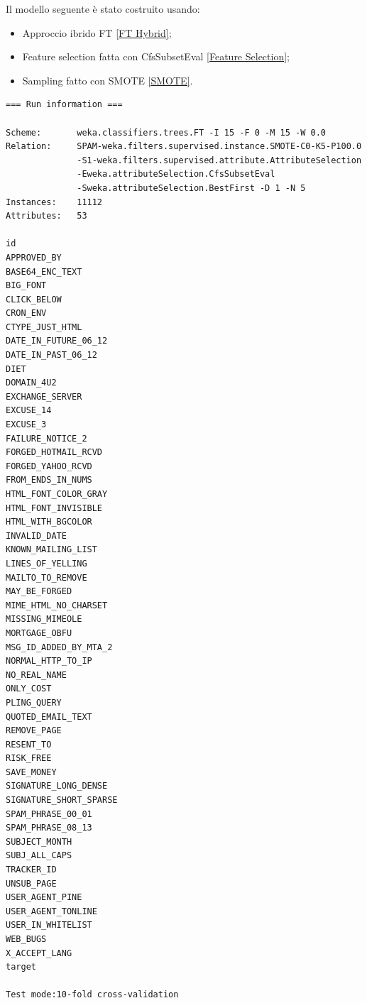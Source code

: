 Il modello seguente è stato costruito usando:
\begin{itemize}
	\item Approccio ibrido FT \ref{FT Hybrid};
	\item Feature selection fatta con CfsSubsetEval \ref{Feature Selection};
	\item Sampling fatto con SMOTE \ref{SMOTE}.
\end{itemize}

\lstset{style=customWeka}
\begin{lstlisting}
=== Run information ===

Scheme:		  weka.classifiers.trees.FT -I 15 -F 0 -M 15 -W 0.0
Relation:     SPAM-weka.filters.supervised.instance.SMOTE-C0-K5-P100.0
			  -S1-weka.filters.supervised.attribute.AttributeSelection
			  -Eweka.attributeSelection.CfsSubsetEval
			  -Sweka.attributeSelection.BestFirst -D 1 -N 5
Instances:    11112
Attributes:   53

id
APPROVED_BY
BASE64_ENC_TEXT
BIG_FONT
CLICK_BELOW
CRON_ENV
CTYPE_JUST_HTML
DATE_IN_FUTURE_06_12
DATE_IN_PAST_06_12			
DIET
DOMAIN_4U2					
EXCHANGE_SERVER
EXCUSE_14					
EXCUSE_3
FAILURE_NOTICE_2			
FORGED_HOTMAIL_RCVD
FORGED_YAHOO_RCVD			
FROM_ENDS_IN_NUMS
HTML_FONT_COLOR_GRAY		
HTML_FONT_INVISIBLE
HTML_WITH_BGCOLOR			
INVALID_DATE
KNOWN_MAILING_LIST			
LINES_OF_YELLING
MAILTO_TO_REMOVE			
MAY_BE_FORGED
MIME_HTML_NO_CHARSET		
MISSING_MIMEOLE
MORTGAGE_OBFU				
MSG_ID_ADDED_BY_MTA_2
NORMAL_HTTP_TO_IP			
NO_REAL_NAME
ONLY_COST					
PLING_QUERY
QUOTED_EMAIL_TEXT			
REMOVE_PAGE
RESENT_TO					
RISK_FREE
SAVE_MONEY					
SIGNATURE_LONG_DENSE
SIGNATURE_SHORT_SPARSE		
SPAM_PHRASE_00_01
SPAM_PHRASE_08_13			
SUBJECT_MONTH
SUBJ_ALL_CAPS				
TRACKER_ID
UNSUB_PAGE					
USER_AGENT_PINE
USER_AGENT_TONLINE			
USER_IN_WHITELIST
WEB_BUGS					
X_ACCEPT_LANG
target

Test mode:10-fold cross-validation

\end{lstlisting}

\lstset{style=custWeka2}

